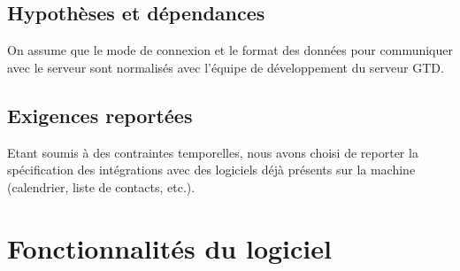 	\subsection{Hypothèses et dépendances}

On assume que le mode de connexion et le format des données pour communiquer avec le serveur sont normalisés avec l'équipe de développement du serveur GTD.


\subsection{Exigences reportées}

Etant soumis à des contraintes temporelles, nous avons choisi de reporter la spécification des intégrations avec des logiciels déjà présents sur la machine (calendrier, liste de contacts, etc.).



\section{Fonctionnalités du logiciel}


